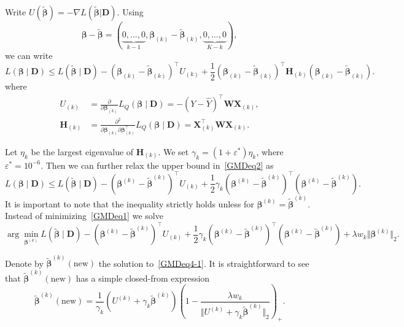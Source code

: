 \documentclass[12pt,letter]{article}\usepackage[]{graphicx}\usepackage[]{color}
\newcommand{\bD}{\textbf{D}}
\newcommand{\bH}{\textbf{H}}
\newcommand{\trans}{\top}
\newcommand{\bbeta}{\boldsymbol{\beta}}
\newcommand{\bbk}{\boldsymbol{\beta}_{(k)}}
\newcommand{\bbkt}{\widetilde{\boldsymbol{\beta}}_{(k)}}
\begin{document}
Write $U(\widetilde{\bbeta})=-\nabla L(\widetilde{\bbeta}|\bD)$. Using
\[
\bbeta-\widetilde{\bbeta}=(\underbrace{0,\ldots,0}_{k-1},\bbk-\bbkt,\underbrace{0,\ldots,0}_{K-k}),
\]
we can write
\begin{equation}
	L(\bbeta\mid\bD)\le L(\widetilde{\bbeta}\mid\bD)-(\bbk-\bbkt)^{\trans}U_{(k)}+\frac{1}{2}(\bbk-\bbkt)^{\trans}\bH_{(k)}(\bbk-\bbkt).\label{GMDeq2}
\end{equation}
where
\begin{align}
	U_{(k)} & =\frac{\partial}{\partial\bbk}L_{Q}(\bbeta\mid\bD)=-\left(Y-\hat{Y}\right)^{\top}\mathbf{W}\mathbf{X}_{(k)},\label{eq:gradientj-1}\\
	\mathbf{H}_{(k)} & =\frac{\partial^{2}}{\partial\bbk\partial\bbk^{\top}}L_{Q}(\bbeta\mid\bD)=\mathbf{X}_{(k)}^{\top}\mathbf{W}\mathbf{X}_{(k)}.\label{eq:hessianj-1}
\end{align}

Let $\eta_{k}$ be the largest eigenvalue of $\bH_{(k)}$. We set $\gamma_{k}=(1+\varepsilon^{*})\eta_{k}$, where $\varepsilon^{*}=10^{-6}$. Then we can further relax the upper bound in~\eqref{GMDeq2} as
\begin{equation}
	L(\bbeta\mid\bD)\leq L(\widetilde{\bbeta}\mid\bD)-(\bbeta^{(k)}-\widetilde{\bbeta}^{(k)})^{\trans}U_{(k)}+\frac{1}{2}\gamma_{k}(\bbeta^{(k)}-\widetilde{\bbeta}^{(k)})^{\trans}(\bbeta^{(k)}-\widetilde{\bbeta}^{(k)}).\label{GMDeq3-1}
\end{equation}
It is important to note that the inequality strictly holds unless for $\bbeta^{(k)}=\widetilde{\bbeta}^{(k)}$. Instead of minimizing~\eqref{GMDeq1} we solve
\begin{equation}
	\arg\min_{\bbeta^{(k)}}L(\widetilde{\bbeta}\mid\bD)-(\bbeta^{(k)}-\widetilde{\bbeta}^{(k)})^{\trans}U_{(k)}+\frac{1}{2}\gamma_{k}(\bbeta^{(k)}-\widetilde{\bbeta}^{(k)})^{\trans}(\bbeta^{(k)}-\widetilde{\bbeta}^{(k)})+\lambda w_{k}\Vert\bbeta^{(k)}\Vert_{2}.\label{GMDeq4-1}
\end{equation}

Denote by $\widetilde{\bbeta}^{(k)}(\textrm{new})$ the solution to~\eqref{GMDeq4-1}. It is straightforward to see that $\widetilde{\bbeta}^{(k)}(\textrm{new})$ has a simple closed-from expression
\begin{equation}
	\widetilde{\bbeta}^{(k)}(\textrm{new})=\frac{1}{\gamma_{k}}\left(U^{(k)}+\gamma_{k}\widetilde{\bbeta}^{(k)}\right)\left(1-\frac{\lambda w_{k}}{\Vert U^{(k)}+\gamma_{k}\widetilde{\bbeta}^{(k)}\Vert_{2}}\right)_{+}.\label{GMDeq5-1}
\end{equation}
\end{document}
